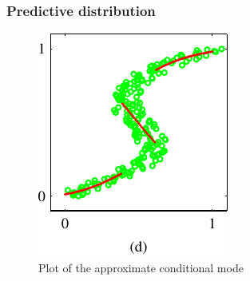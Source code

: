 \documentclass{beamer}
\begin{document}
\begin{frame}
    \frametitle{Predictive distribution}
    \begin{figure}
        \caption{Plot of the approximate conditional mode}
        \includegraphics{Figure_19_d.pdf}
    \end{figure}
\end{frame}
\end{document}
